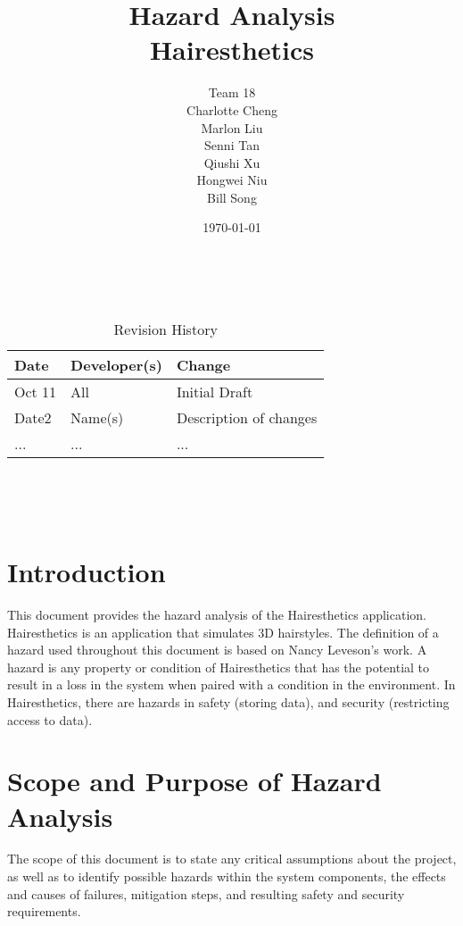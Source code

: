 \documentclass{article}
\title{Hazard Analysis\\Hairesthetics}
\author{Team 18 \\ Charlotte Cheng
        \\ Marlon Liu
        \\ Senni Tan
        \\ Qiushi Xu
        \\ Hongwei Niu
        \\ Bill Song
}
\date{\today}
\begin{document}
\maketitle
\thispagestyle{empty}

~\newpage


\begin{table}[hp]
\caption{Revision History} \label{TblRevisionHistory}
\begin{tabularx}{\textwidth}{llX}
\toprule
\textbf{Date} & \textbf{Developer(s)} & \textbf{Change}\\
\midrule
Oct 11 & All & Initial Draft\\
Date2 & Name(s) & Description of changes\\
... & ... & ...\\
\bottomrule
\end{tabularx}
\end{table}

~\newpage

\tableofcontents
\listoftables

~\newpage



\section{Introduction}

This document provides the hazard analysis of the Hairesthetics application. Hairesthetics is an application that simulates 3D hairstyles. The definition of a hazard used throughout this document is based on Nancy Leveson's work. A hazard is any property or condition of Hairesthetics that has the potential to result in a loss in the system when paired with a condition in the environment. In Hairesthetics, there are hazards in safety (storing data), and security (restricting access to data). 

\section{Scope and Purpose of Hazard Analysis}
The scope of this document is to state any critical assumptions about the project, as well as to identify possible hazards within the system components, the effects and causes of failures, mitigation steps, and resulting safety and security requirements.
\end{document}
